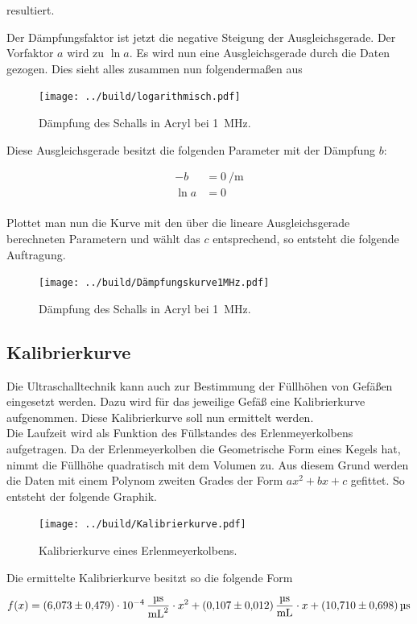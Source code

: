 \noindent resultiert.

\noindent Der Dämpfungsfaktor ist jetzt die negative Steigung der Ausgleichsgerade. Der Vorfaktor $a$ wird 
zu $\ln{a}$. Es wird nun eine Ausgleichsgerade durch die Daten gezogen. Dies sieht alles zusammen nun folgendermaßen aus

\begin{figure}[H]
    \centering
    \texttt{[image: ../build/logarithmisch.pdf]}
    \caption{Dämpfung des Schalls in Acryl bei \qty{1}{\mega\hertz}.}
\end{figure}

\noindent Diese Ausgleichsgerade besitzt die folgenden Parameter mit der Dämpfung $b$:

\begin{align*}
    -b &= \qty{0}{\per \meter} \\
    \ln{a} &= \num{0} \\
\end{align*}

\noindent Plottet man nun die Kurve mit den über die lineare Ausgleichsgerade berechneten Parametern und wählt das $c$ entsprechend, 
so entsteht die folgende Auftragung.

\begin{figure}[H]
    \centering
    \texttt{[image: ../build/Dämpfungskurve1MHz.pdf]}
    \caption{Dämpfung des Schalls in Acryl bei \qty{1}{\mega\hertz}.}
\end{figure}



\subsection{Kalibrierkurve}
Die Ultraschalltechnik kann auch zur Bestimmung der Füllhöhen von Gefäßen eingesetzt werden. Dazu wird für das jeweilige Gefäß 
eine Kalibrierkurve aufgenommen. Diese Kalibrierkurve soll nun ermittelt werden. \\
\noindent Die Laufzeit wird als Funktion des Füllstandes des Erlenmeyerkolbens aufgetragen. Da der Erlenmeyerkolben 
die Geometrische Form eines Kegels hat, nimmt die Füllhöhe quadratisch mit dem Volumen zu. Aus diesem Grund werden die Daten 
mit einem Polynom zweiten Grades der Form $ax^2 +bx +c$ gefittet. So entsteht der folgende Graphik.

\begin{figure}[H]
    \centering
    \texttt{[image: ../build/Kalibrierkurve.pdf]}
    \caption{Kalibrierkurve eines Erlenmeyerkolbens.}
\end{figure}

\noindent Die ermittelte Kalibrierkurve besitzt so die folgende Form

\begin{equation*}
    f(x)= \qty{6.073\pm0.479e-4}{\micro \second \per \milli \liter \squared } \cdot x^2   +  
          \qty{0.107\pm0.012}{\micro \second \per \milli \liter}              \cdot x     +
          \qty{10.71\pm0.698}{\micro \second }
\end{equation*}











